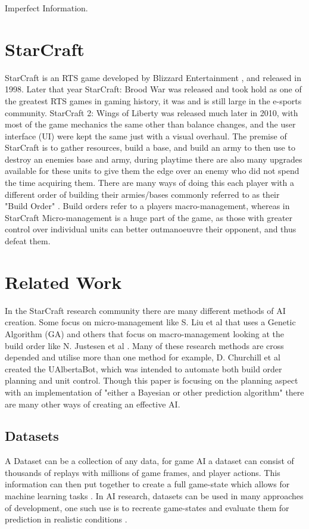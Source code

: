 \documentclass[journal]{IEEEtran}
\begin{document}
Imperfect Information.

\section{StarCraft}
StarCraft is an RTS game developed by Blizzard Entertainment \cite{Blizzard}\cite{Release}, and released in 1998. Later that year StarCraft: Brood War was released and took hold as one of the greatest RTS games in gaming history, it was and is still large in the e-sports community. StarCraft 2: Wings of Liberty was released much later in 2010, with most of the game mechanics the same other than balance changes, and the user interface (UI) were kept the same just with a visual overhaul. The premise of StarCraft is to gather resources, build a base, and build an army to then use to destroy an enemies base and army, during playtime there are also many upgrades available for these units to give them the edge over an enemy who did not spend the time acquiring them. There are many ways of doing this each player with a different order of building their armies/bases commonly referred to as their "Build Order" \cite{BuildOrder}. Build orders refer to a players macro-management, whereas in StarCraft Micro-management is a huge part of the game, as those with greater control over individual units can better outmanoeuvre their opponent, and thus defeat them. 

\section{Related Work}
In the StarCraft research community there are many different methods of AI creation. Some focus on micro-management like S. Liu et al \cite{EffectiveMicro} that uses a Genetic Algorithm (GA) and others that focus on macro-management looking at the build order like N. Justesen et al \cite{OnlineEvo}. Many of these research methods are cross depended and utilise more than one method for example, D. Churchill et al \cite{Agents} created the UAlbertaBot, which was intended to automate both build order planning and unit control. Though this paper is focusing on the planning aspect with an implementation of "either a Bayesian or other prediction algorithm" there are many other ways of creating an effective AI.

\subsection{Datasets}
A Dataset can be a collection of any data, for game AI a dataset can consist of thousands of replays with millions of game frames, and player actions\cite{Dataset}. This information can then put together to create a full game-state which allows for machine learning tasks \cite{Dataset17}. In AI research, datasets can be used in many approaches of development, one such use is to recreate game-states and evaluate them for prediction in realistic conditions \cite{SpecialTactics}.
\end{document}
